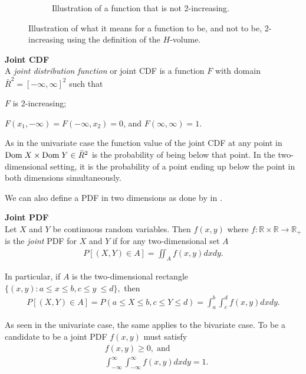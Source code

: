 \begin{figure}[h]
\begin{subfigure}[t]{0.45\linewidth}
        \caption{Illustration of a function that is not 2-increasing.}
    \end{subfigure}
    \caption{Illustration of what it means for a function to be, and not to be, 2-increasing using the definition of the $H$-volume.}
    \label{fig:2-Increasing}
\end{figure}


\begin{definition}\label{def:JointCDF} \textbf{Joint CDF} \\
    A \emph{joint distribution function} or joint \gls{CDF} is a function $F$ with domain $\bar{R}^2 = [-\infty, \infty]^2$ such that 
    \begin{compactenum}
        \item $F$ is 2-increasing; 
        \item $F(x_1,-\infty)= F(-\infty, x_2) = 0$, and $F(\infty,\infty)=1$.
    \end{compactenum}
\end{definition}

As in the univariate case the function value of the joint \gls{CDF} at any point in $\mathrm{Dom \;} X\times \mathrm{Dom \;} Y \in\bar{R}^2$ is the probability of being below that point. In the two-dimensional setting, it is the probability of a point ending up below the point in both dimensions simultaneously. 

We can also define a \gls{PDF} in two dimensions as done by  in .

\begin{definition}\label{def:JointPDF} \textbf{Joint PDF}\\
    Let $X$ and $Y$ be continuous random variables. Then $f(x,y)$ where $f:\mathbb{R}\times\mathbb{R}\to \mathbb{R}_+$ is the \emph{joint} \gls{PDF} for $X$ and $Y$ if for any two-dimensional set $A$ 
    \begin{align*}
        P[(X,Y) \in A] =  \iint_A f(x,y)dxdy.
    \end{align*}
    
    In particular, if $A$ is the two-dimensional rectangle $\{(x,y) : a\leq x \leq b, c\leq y \ \leq d\}, $ then
    \begin{align*}
        P[(X,Y) \in A] = P(a\leq X \leq b, c \leq Y \leq d) =\int_a^b\!\!\!\int_c^d f(x,y)dxdy.
    \end{align*}
\end{definition}

\begin{remark}
    As seen in the univariate case, the same applies to the bivariate case. To be a candidate to be a joint \gls{PDF} $f(x,y)$ must satisfy 
    \begin{align*}
        &f(x,y) \geq 0, \;\mathrm{and} \\
        &\int_{-\infty}^{\infty}\!\int_{-\infty}^{\infty}f(x,y)dxdy=1.
    \end{align*}    
\end{remark}


